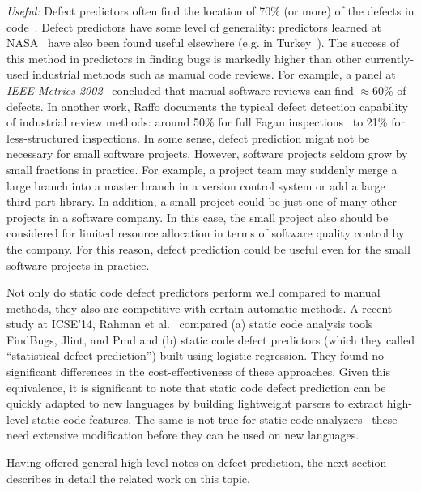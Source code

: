 {\em Useful:}
Defect predictors often  find the location of  70\% (or more)
of the defects in code~\cite{me07b}.
Defect predictors have some level of generality:
predictors learned at NASA~\cite{me07b} have also been found useful elsewhere
(e.g. in Turkey~\cite{tosun10,tosun09}).
The success of this method in  predictors in finding bugs is   markedly
higher than other currently-used
industrial
methods such as manual code reviews. For example, 
a  panel at {\em IEEE Metrics
2002}~\cite{shu02} concluded that manual software  reviews can find ${\approx}60\%$ 
of defects.
In another work, 
Raffo documents the typical    defect detection capability of
industrial review methods:   around 50\%
 for full Fagan inspections~\cite{fagan76} to
21\% for less-structured inspections.
In some sense, defect prediction might not be necessary for small software projects.
However, software projects seldom grow by small fractions in practice. For example, a project team may suddenly merge a large branch into a master branch in a version control system or add a large third-part library. In addition, a small project could be just one of many other projects in a software company. In this case, the small project also should be considered for limited resource allocation in terms of software quality control by the company. For this reason, defect prediction could be useful even for the small software projects in practice.

Not only do static code defect predictors perform well compared to manual methods,
they also are competitive with certain automatic methods.
A recent study at ICSE'14, Rahman et al.~\cite{rahman14:icse} compared
(a) static code analysis tools FindBugs, Jlint, and Pmd and (b)
static code defect predictors
(which they called ``statistical defect prediction'') built using logistic regression.
They found  no significant differences in the cost-effectiveness
of these  approaches. Given this equivalence, it is significant to note that 
static code defect prediction can be quickly adapted to new languages by building lightweight
parsers to extract high-level static code features. The same is not true for   static code analyzers-- these need  extensive modification before they can be used on new
languages.

Having offered general high-level notes on defect prediction,
the next section describes in detail the related work on this topic.
